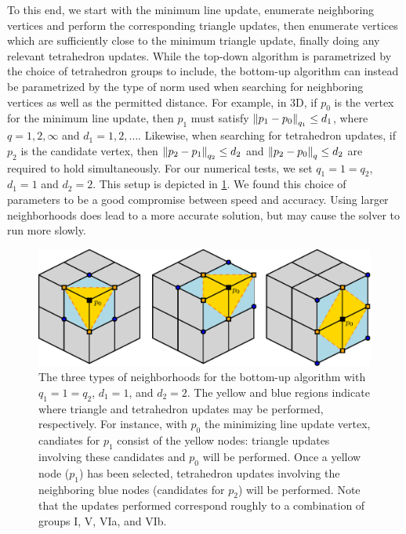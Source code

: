 \documentclass[eikonal.tex]{subfiles}
\begin{document}
To this end, we start with the minimum line update, enumerate
neighboring vertices and perform the corresponding triangle updates,
then enumerate vertices which are sufficiently close to the minimum
triangle update, finally doing any relevant tetrahedron updates. While
the top-down algorithm is parametrized by the choice of tetrahedron
groups to include, the bottom-up algorithm can instead be parametrized
by the type of norm used when searching for neighboring vertices as
well as the permitted distance. For example, in 3D, if $p_0$ is the
vertex for the minimum line update, then $p_1$ must satisfy
$\left\|p_1 - p_0\right\|_{q_1} \leq d_1$, where $q = 1, 2, \infty$ and
$d_1 = 1, 2, \hdots$. Likewise, when searching for tetrahedron
updates, if $p_2$ is the candidate vertex, then
$\left\|p_2 - p_1\right\|_{q_2} \leq d_2$ and $\left\|p_2 - p_0\right\|_q \leq d_2$
are required to hold simultaneously. For our numerical tests, we set
$q_1 = 1 = q_2$, $d_1 = 1$ and $d_2 = 2$. This setup is depicted in
\cref{fig:hu-neighborhoods}. We found this choice of parameters to be
a good compromise between speed and accuracy. Using larger
neighborhoods does lead to a more accurate solution, but may cause the
solver to run more slowly.

\begin{figure}[t]
  \centering
  \includegraphics[width=0.85\linewidth]{hu-neighborhoods.eps}
  \caption{The three types of neighborhoods for the bottom-up
    algorithm with $q_1 = 1 = q_2$, $d_1 = 1$, and $d_2 = 2$. The
    yellow and blue regions indicate where triangle and tetrahedron
    updates may be performed, respectively. For instance, with $p_0$
    the minimizing line update vertex, candiates for $p_1$ consist of
    the yellow nodes: triangle updates involving these candidates and
    $p_0$ will be performed. Once a yellow node ($p_1$) has been
    selected, tetrahedron updates involving the neighboring blue nodes
    (candidates for $p_2$) will be performed. Note that the updates
    performed correspond roughly to a combination of groups I, V, VIa,
    and VIb.}\label{fig:hu-neighborhoods}
\end{figure}
\end{document}
